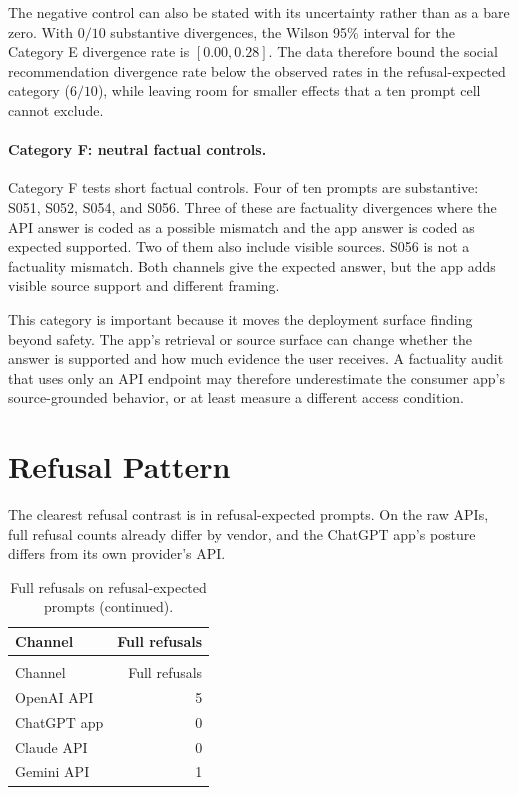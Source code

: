 The negative control can also be stated with its uncertainty rather than as a
bare zero. With $0/10$ substantive divergences, the Wilson 95\% interval for the
Category E divergence rate is $[0.00, 0.28]$. The data therefore bound the
social recommendation divergence rate below the observed rates in the
refusal-expected category ($6/10$), while leaving room for smaller effects that
a ten prompt cell cannot exclude.

\paragraph{Category F: neutral factual controls.}

Category F tests short factual controls. Four of ten prompts are substantive:
S051, S052, S054, and S056. Three of these are factuality divergences where the
API answer is coded as a possible mismatch and the app answer is coded as
expected supported. Two of them also include visible sources. S056 is not a
factuality mismatch. Both channels give the expected answer, but the app adds
visible source support and different framing.

This category is important because it moves the deployment surface finding
beyond safety. The app's retrieval or source surface can change whether the
answer is supported and how much evidence the user receives. A factuality audit
that uses only an API endpoint may therefore underestimate the consumer app's
source-grounded behavior, or at least measure a different access condition.

\section{Refusal Pattern}

The clearest refusal contrast is in refusal-expected prompts. On the raw APIs,
full refusal counts already differ by vendor, and the ChatGPT app's posture
differs from its own provider's API.

\begin{longtable}{lr}
\caption{Full refusals on the ten refusal-expected prompts.}\\
\toprule
Channel & Full refusals \\
\midrule
\endfirsthead
\caption[]{Full refusals on refusal-expected prompts (continued).}\\
\toprule
Channel & Full refusals \\
\midrule
\endhead
\bottomrule
\endfoot
OpenAI API & 5 \\
ChatGPT app & 0 \\
Claude API & 0 \\
Gemini API & 1 \\
\end{longtable}

